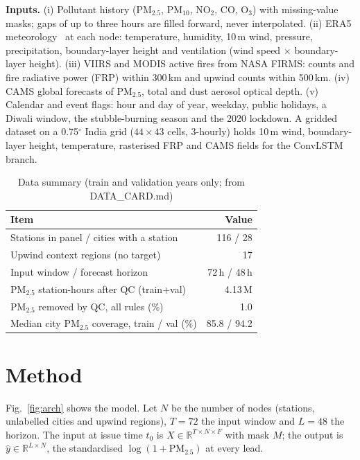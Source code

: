 \documentclass[conference]{IEEEtran}
\begin{document}
\textbf{Inputs.} (i) Pollutant history (PM$_{2.5}$, PM$_{10}$, NO$_2$, CO, O$_3$) with missing-value masks; gaps of up to
three hours are filled forward, never interpolated. (ii) ERA5 meteorology~\cite{Hersbach_2020} at each node: temperature,
humidity, 10\,m wind, pressure, precipitation, boundary-layer height and ventilation (wind speed $\times$ boundary-layer
height). (iii) VIIRS and MODIS active fires from NASA FIRMS: counts and fire radiative power (FRP) within 300\,km and
upwind counts within 500\,km. (iv) CAMS global forecasts of PM$_{2.5}$, total and dust aerosol optical depth. (v)
Calendar and event flags: hour and day of year, weekday, public holidays, a Diwali window, the stubble-burning season and
the 2020 lockdown. A gridded dataset on a 0.75$^\circ$ India grid ($44\times43$ cells, 3-hourly) holds 10\,m wind,
boundary-layer height, temperature, rasterised FRP and CAMS fields for the ConvLSTM branch.

\begin{table}[t]
\centering
\caption{Data summary (train and validation years only; from DATA\_CARD.md)}
\label{tab:data}
\begin{tabular}{lr}
\toprule
Item & Value \\
\midrule
Stations in panel / cities with a station & 116 / 28 \\
Upwind context regions (no target) & 17 \\
Input window / forecast horizon & 72\,h / 48\,h \\
PM$_{2.5}$ station-hours after QC (train+val) & 4.13\,M \\
PM$_{2.5}$ removed by QC, all rules (\%) & 1.0 \\
Median city PM$_{2.5}$ coverage, train / val (\%) & 85.8 / 94.2 \\
\bottomrule
\end{tabular}
\end{table}

\section{Method}
Fig.~\ref{fig:arch} shows the model. Let $N$ be the number of nodes (stations, unlabelled cities and upwind regions), $T=72$
the input window and $L=48$ the horizon. The input at issue time $t_0$ is $X\in\mathbb{R}^{T\times N\times F}$ with mask
$M$; the output is $\hat{y}\in\mathbb{R}^{L\times N}$, the standardised $\log(1+\text{PM}_{2.5})$ at every lead.
\end{document}
